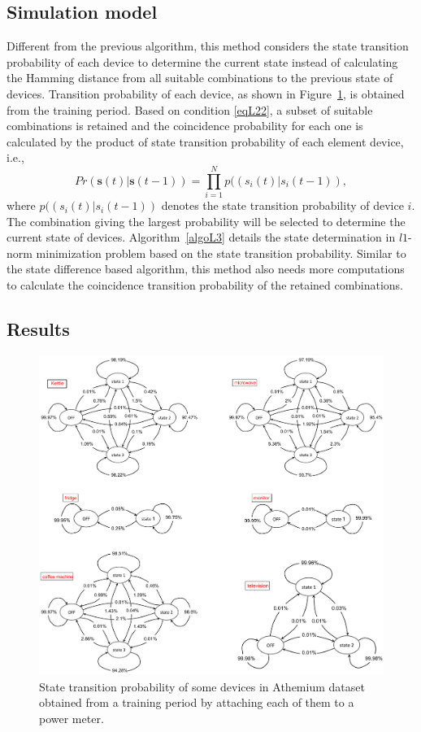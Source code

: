 \subsection{Simulation model}
Different from the previous algorithm, this method considers the state transition probability of each device to determine the current state instead of calculating the Hamming distance from all suitable combinations to the previous state of devices. Transition probability of each device, as shown in Figure~\ref{fig:L1}, is obtained from the training period. Based on condition \eqref{eqL22}, a subset of suitable combinations is retained and the coincidence probability for each one is calculated by the product of state transition probability of each element device, i.e.,
\begin{equation}\label{eqL5}
Pr(\mathbf{s}(t)|\mathbf{s}(t-1)) = \prod_{i=1}^{N}{p((s_i(t)|s_i(t-1))},
\end{equation}
where $p((s_i(t)|s_i(t-1))$ denotes the state transition probability of device $i$. The combination giving the largest probability will be selected to determine the current state of devices. Algorithm~\ref{algoL3} details the state determination in $l1$-norm minimization problem based on the state transition probability.
Similar to the state difference based algorithm, this method also needs more computations to calculate the coincidence transition probability of the retained combinations.
\subsection{Results}
\begin{figure}
\centering
\includegraphics[width=1\textwidth]{./chapters/chapter3/images/Athemium_trans_proba.pdf} 
\caption{State transition probability of some devices in Athemium dataset obtained from a training period by attaching each of them to a power meter.} 
\label{fig:L1} 
\end{figure}

